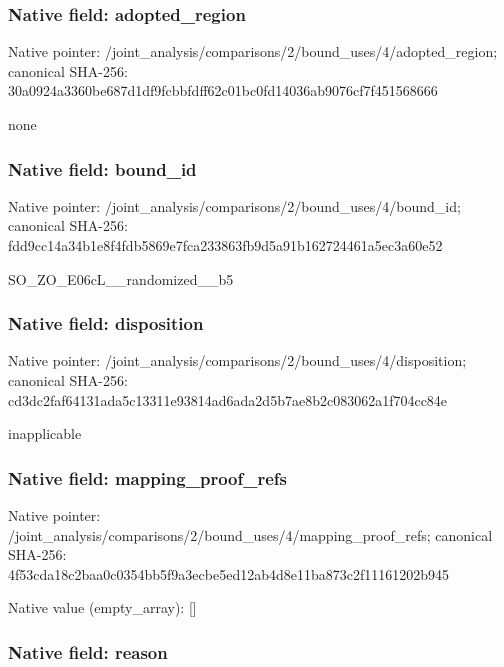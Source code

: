 \documentclass[10pt,a4paper]{article}
\begin{document}
\subsubsection{Native field: adopted\_region}


Native pointer: /joint\_analysis/comparis\allowbreak{}ons/2/bound\_uses/4/adopt\allowbreak{}ed\_region; canonical SHA-256: 30a0924a3360be687d1df9fc\allowbreak{}bbfdff62c01bc0fd14036ab9\allowbreak{}076cf7f451568666


none


\subsubsection{Native field: bound\_id}


Native pointer: /joint\_analysis/comparis\allowbreak{}ons/2/bound\_uses/4/bound\allowbreak{}\_id; canonical SHA-256: fdd9cc14a34b1e8f4fdb5869\allowbreak{}e7fca233863fb9d5a91b1627\allowbreak{}24461a5ec3a60e52


SO\_ZO\_E06cL\_\_randomized\_\_b5


\subsubsection{Native field: disposition}


Native pointer: /joint\_analysis/comparis\allowbreak{}ons/2/bound\_uses/4/dispo\allowbreak{}sition; canonical SHA-256: cd3dc2faf64131ada5c13311\allowbreak{}e93814ad6ada2d5b7ae8b2c0\allowbreak{}83062a1f704cc84e


inapplicable


\subsubsection{Native field: mapping\_proof\_refs}


Native pointer: /joint\_analysis/comparis\allowbreak{}ons/2/bound\_uses/4/mappi\allowbreak{}ng\_proof\_refs; canonical SHA-256: 4f53cda18c2baa0c0354bb5f\allowbreak{}9a3ecbe5ed12ab4d8e11ba87\allowbreak{}3c2f11161202b945



Native value (empty\_array): []



\subsubsection{Native field: reason}
\end{document}
